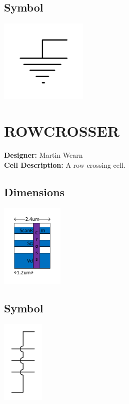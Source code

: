 \begin{multicols}{2}
\subsection*{Symbol}\includegraphics[width=\textwidth,height=4cm,keepaspectratio=true]{../tielow/symbol.pdf}
\end{multicols}

\section{ROWCROSSER} \makebox[\linewidth]{\rule{\textwidth}{0.4pt}}
{\bf Designer: } Martin Wearn\\
{\bf Cell Description: } A row crossing cell.\\
\begin{multicols}{2}
\subsection*{Dimensions}\includegraphics[width=\textwidth,height=4cm,keepaspectratio=true]{../rowcrosser/blackbox.pdf}
\subsection*{Symbol}\includegraphics[width=\textwidth,height=4cm,keepaspectratio=true]{../rowcrosser/symbol.pdf}
\end{multicols}
